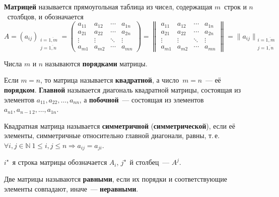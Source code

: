  \textbf{Матрицей} называется прямоугольная таблица из чисел, содержащая $m$~строк и $n$~столбцов, и обозначается
\begin{equation*}
A = (a_{ij})_{\begin{smallmatrix}
i = \overline{1, m} \\
j = \overline{1, n}
\end{smallmatrix}} =
\begin{pmatrix}
a_{11} & a_{12} & \cdots & a_{1n} \\
a_{21} & a_{22} & \cdots & a_{2n} \\
\vdots & \vdots & \ddots & \vdots \\
a_{m1} & a_{m2} & \cdots & a_{mn}
\end{pmatrix} =
\begin{Vmatrix}
a_{11} & a_{12} & \cdots & a_{1n} \\
a_{21} & a_{22} & \cdots & a_{2n} \\
\vdots & \vdots & \ddots & \vdots \\
a_{m1} & a_{m2} & \cdots & a_{mn}
\end{Vmatrix} =
\|a_{ij}\|_{\begin{smallmatrix}
i = \overline{1, m} \\
j = \overline{1, n}
\end{smallmatrix}}
\end{equation*}

Числа $m$ и $n$ называются \textbf{порядками} матрицы.

Если $m = n$, то матрица называется \textbf{квадратной}, а число~$m = n$~--- её \textbf{порядком}.
\textbf{Главной} называется диагональ квадратной матрицы, состоящая из элементов $a_{11}, a_{22}, \ldots, a_{nn}$, а \textbf{побочной}~--- состоящая из элементов $a_{n1}, a_{n-1\, 2}, \ldots, a_{1n}$.

Квадратная матрица называется \textbf{симметричной} (\textbf{симметрической}), если её элементы, симметричные относительно главной диагонали, равны, т.\,е. $\forall i, j \in \mathbb N \ 1 \leqslant i, j \leqslant n \Rightarrow a_{ij} = a_{ji}$.

$i$"~я строка матрицы обозначается $A_i$, $j$"~й столбец~--- $A^j$.

Две матрицы называются \textbf{равными}, если их порядки и соответствующие элементы совпадают, иначе~--- \textbf{неравными}.